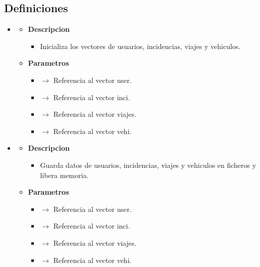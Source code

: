 \subsection{Definiciones}
\begin{itemize}
     \item {}
    \begin{itemize}
        \item \textbf{Descripcion}
        \begin{itemize}
			\item Inicializa los vectores de usuarios, incidencias, viajes y vehiculos.
		\end{itemize}
		\item \textbf{Parametros}
		\begin{itemize}
			\item {} $\rightarrow$ Referencia al vector user.
			\item {} $\rightarrow$ Referencia al vector inci.
			\item {} $\rightarrow$ Referencia al vector viajes.
			\item {} $\rightarrow$ Referencia al vector vehi.
		\end{itemize}
	\end{itemize}
    \item {}
    \begin{itemize}
        \item \textbf{Descripcion}
        \begin{itemize}
			\item Guarda datos de usuarios, incidencias, viajes y vehiculos en ficheros y libera memoria.
		\end{itemize}
		\item \textbf{Parametros}
		\begin{itemize}
			\item {} $\rightarrow$ Referencia al vector user.
			\item {} $\rightarrow$ Referencia al vector inci.
			\item {} $\rightarrow$ Referencia al vector viajes.
			\item {} $\rightarrow$ Referencia al vector vehi.
		\end{itemize}
	\end{itemize}
\end{itemize}
\newpage
